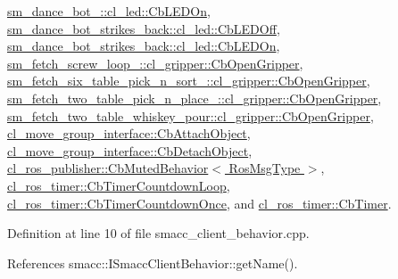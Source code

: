 \hyperlink{classsm__dance__bot__2_1_1cl__led_1_1CbLEDOn_a461d3e1829d785ab490fce9827868e39}{sm\+\_\+dance\+\_\+bot\+\_\+::cl\+\_\+led\+::\+Cb\+L\+E\+D\+On}, \hyperlink{classsm__dance__bot__strikes__back_1_1cl__led_1_1CbLEDOff_a6b4ac6e1c516ced8515e6b6641c5d063}{sm\+\_\+dance\+\_\+bot\+\_\+strikes\+\_\+back\+::cl\+\_\+led\+::\+Cb\+L\+E\+D\+Off}, \hyperlink{classsm__dance__bot__strikes__back_1_1cl__led_1_1CbLEDOn_aadafa99cd7c683a9d1ae59b5158826d9}{sm\+\_\+dance\+\_\+bot\+\_\+strikes\+\_\+back\+::cl\+\_\+led\+::\+Cb\+L\+E\+D\+On}, \hyperlink{classsm__fetch__screw__loop__1_1_1cl__gripper_1_1CbOpenGripper_aef1b4dc2e4a1044d17a22fa59bcc845e}{sm\+\_\+fetch\+\_\+screw\+\_\+loop\+\_\+::cl\+\_\+gripper\+::\+Cb\+Open\+Gripper}, \hyperlink{classsm__fetch__six__table__pick__n__sort__1_1_1cl__gripper_1_1CbOpenGripper_af3a0e441062c96f2627b69c31b532ce3}{sm\+\_\+fetch\+\_\+six\+\_\+table\+\_\+pick\+\_\+n\+\_\+sort\+\_\+::cl\+\_\+gripper\+::\+Cb\+Open\+Gripper}, \hyperlink{classsm__fetch__two__table__pick__n__place__1_1_1cl__gripper_1_1CbOpenGripper_aa5943cc677a643e9e7cd5d57766857fc}{sm\+\_\+fetch\+\_\+two\+\_\+table\+\_\+pick\+\_\+n\+\_\+place\+\_\+::cl\+\_\+gripper\+::\+Cb\+Open\+Gripper}, \hyperlink{classsm__fetch__two__table__whiskey__pour_1_1cl__gripper_1_1CbOpenGripper_a3267475dda769cb426c0ae3d56572d76}{sm\+\_\+fetch\+\_\+two\+\_\+table\+\_\+whiskey\+\_\+pour\+::cl\+\_\+gripper\+::\+Cb\+Open\+Gripper}, \hyperlink{classcl__move__group__interface_1_1CbAttachObject_a6e85287bde0cedc12a90da8776ed4a16}{cl\+\_\+move\+\_\+group\+\_\+interface\+::\+Cb\+Attach\+Object}, \hyperlink{classcl__move__group__interface_1_1CbDetachObject_ae5c6ada3c6631c9fa0bfb2d461ce4678}{cl\+\_\+move\+\_\+group\+\_\+interface\+::\+Cb\+Detach\+Object}, \hyperlink{classcl__ros__publisher_1_1CbMutedBehavior_a4c02187c58358fa811777d9956510222}{cl\+\_\+ros\+\_\+publisher\+::\+Cb\+Muted\+Behavior$<$ Ros\+Msg\+Type $>$}, \hyperlink{classcl__ros__timer_1_1CbTimerCountdownLoop_a5623e9fdd8f0fb23e8707f7816c099d6}{cl\+\_\+ros\+\_\+timer\+::\+Cb\+Timer\+Countdown\+Loop}, \hyperlink{classcl__ros__timer_1_1CbTimerCountdownOnce_ab602b778a299b42e8cc9f4bf3da0a234}{cl\+\_\+ros\+\_\+timer\+::\+Cb\+Timer\+Countdown\+Once}, and \hyperlink{classcl__ros__timer_1_1CbTimer_a04184e2679c32363c876e1d6b4746072}{cl\+\_\+ros\+\_\+timer\+::\+Cb\+Timer}.



Definition at line 10 of file smacc\+\_\+client\+\_\+behavior.\+cpp.



References smacc\+::\+I\+Smacc\+Client\+Behavior\+::get\+Name().


